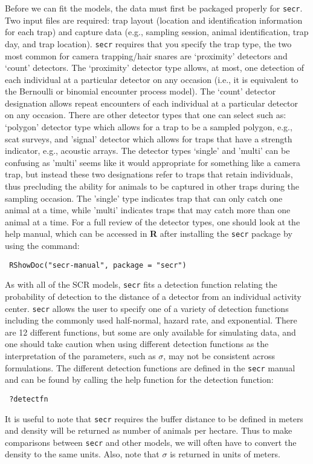 Before we can fit the models, the data must first be packaged properly
for 
\mbox{\tt secr}.  Two input files are required: trap layout (location and
identification information for each trap) and capture data (e.g.,
sampling session, animal identification, trap day, and trap location).
\mbox{\tt secr} requires that you specify the trap type, the two most common for
camera trapping/hair snares are `proximity' detectors and `count'
detectors.  The `proximity' detector type allows, at most, one
detection of each individual at a particular detector on any occasion
(i.e., it is equivalent to the Bernoulli or binomial encounter process
model).
The `count' detector designation allows repeat encounters of each
individual at a particular detector on any occasion.  There are other
detector types that one can select such as: `polygon' detector type
which allows for a trap to be a sampled polygon, e.g., scat surveys,
and 'signal' detector which allows for traps that have a strength
indicator, e.g., acoustic arrays.  The detector types `single' and
'multi' can be confusing as 'multi' seems like it would appropriate
for something like a camera trap, but instead these two designations
refer to traps that retain individuals, thus precluding the ability
for animals to be captured in other traps during the sampling
occasion.  The 'single' type indicates trap that can only catch one
animal at a time, while 'multi' indicates traps that may catch more
than one animal at a time.  For a full review of the detector types,
one should look at the help manual, which can be accessed in {\bf R} after
installing the \mbox{\tt secr} package by using the command:
\begin{verbatim}
 RShowDoc("secr-manual", package = "secr")
\end{verbatim}
As with all of the SCR models, \mbox{\tt secr} fits a detection function relating
the probability of detection to the distance of a detector from an
individual activity center. \mbox{\tt secr} allows the user to specify one of a
variety of detection functions including the commonly used
half-normal, hazard rate, and exponential.  There are 12 different
functions, but some are only available for simulating data, and one
should take caution when using different detection functions as the
interpretation of the parameters, such as $\sigma$, may not be consistent
across formulations.  The different detection functions are defined in
the \mbox{\tt secr} manual and can be found by calling the help function for the
detection function:
\begin{verbatim}
 ?detectfn
\end{verbatim}
It is useful to note that \mbox{\tt secr} requires the buffer distance to be
defined in meters and density will be returned as number of animals
per hectare.  Thus to make comparisons between \mbox{\tt secr} and other models,
we will often have to convert the density to the same units.  Also,
note that $\sigma$ is returned in units of meters.


